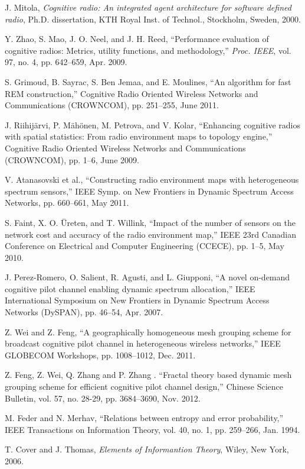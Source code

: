\documentclass[conference]{IEEEtran}
\begin{document}
\begin{thebibliography}{99}

J. Mitola,
{\em Cognitive radio: An integrated agent architecture for software defined radio},
Ph.D. dissertation, KTH Royal Inst. of Technol., Stockholm, Sweden, 2000.

Y. Zhao, S. Mao, J. O. Neel, and J. H. Reed,
``Performance evaluation of cognitive radios: Metrics, utility functions, and methodology,''
{\em Proc. IEEE}, vol. 97, no. 4, pp. 642--659, Apr. 2009.

S. Grimoud, B. Sayrac, S. Ben Jemaa, and E. Moulines, ``An algorithm for fast REM construction,''
Cognitive Radio Oriented Wireless Networks and Communications (CROWNCOM), pp. 251--255, June 2011.

J. Riihij\"{a}rvi, P. M\"{a}h\"{o}nen, M. Petrova, and V. Kolar,
``Enhancing cognitive radios with spatial statistics: From radio environment maps to topology engine,''
Cognitive Radio Oriented Wireless Networks and Communications (CROWNCOM),
pp. 1--6, June 2009.

V. Atanasovski et al.,
``Constructing radio environment maps with heterogeneous spectrum sensors,''
IEEE Symp. on New Frontiers in Dynamic Spectrum Access Networks,
pp. 660--661, May 2011.

S. Faint, X. O. \"{U}reten, and T. Willink,
``Impact of the number of sensors on the network cost and accuracy of the radio environment map,''
IEEE 23rd Canadian Conference on Electrical and Computer Engineering (CCECE),
pp. 1--5, May 2010.

J. Perez-Romero, O. Salient, R. Agusti, and L. Giupponi,
``A novel on-demand cognitive pilot channel enabling dynamic spectrum allocation,''
IEEE International Symposium on New Frontiers in Dynamic Spectrum Access Networks (DySPAN),
pp. 46--54, Apr. 2007.

Z. Wei and Z. Feng,
``A geographically homogeneous mesh grouping scheme for broadcast cognitive pilot channel in heterogeneous wireless networks,''
IEEE GLOBECOM Workshops, pp. 1008--1012, Dec. 2011.

Z. Feng, Z. Wei, Q. Zhang and P. Zhang . ``Fractal theory based dynamic mesh grouping scheme for efficient cognitive pilot channel design,'' Chinese Science Bulletin, vol. 57, no. 28-29, pp. 3684--3690, Nov. 2012.

M. Feder and N. Merhav,
``Relations between entropy and error probability,''
IEEE Transactions on Information Theory, vol. 40, no. 1, pp. 259--266, Jan. 1994.

T. Cover and J. Thomas,
{\em Elements of Informantion Theory},
Wiley, New York, 2006.


\end{thebibliography}
\end{document}
